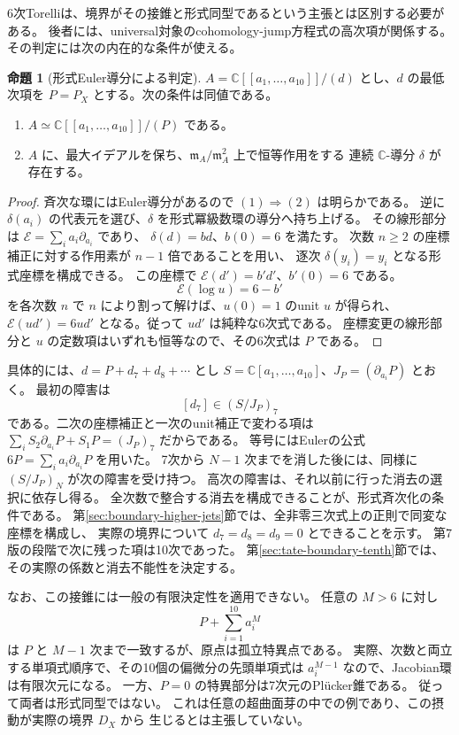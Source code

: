 \documentclass[a4paper,11pt]{ltjsarticle}
\theoremstyle{definition}
\newtheorem{theorem}{命題}[section]
\newcommand{\CC}{\mathbb C}
\begin{document}
6次Torelliは、境界がその接錐と形式同型であるという主張とは区別する必要がある。
後者には、universal対象のcohomology-jump方程式の高次項が関係する。
その判定には次の内在的な条件が使える。

\begin{theorem}[形式Euler導分による判定]\label{prop:boundary-euler}
$A=\CC[[a_1,\ldots,a_{10}]]/(d)$ とし、$d$ の最低次項を
$P=P_X$ とする。次の条件は同値である。
\begin{enumerate}
\item $A\simeq\CC[[a_1,\ldots,a_{10}]]/(P)$ である。
\item $A$ に、最大イデアルを保ち、$\mathfrak m_A/\mathfrak m_A^2$ 上で恒等作用をする
連続 $\CC$-導分 $\delta$ が存在する。
\end{enumerate}
\end{theorem}

\begin{proof}
斉次な環にはEuler導分があるので $(1)\Rightarrow(2)$ は明らかである。
逆に $\delta(a_i)$ の代表元を選び、$\delta$ を形式冪級数環の導分へ持ち上げる。
その線形部分は $\mathcal E=\sum_i a_i\partial_{a_i}$ であり、
$\delta(d)=b d$、$b(0)=6$ を満たす。
次数 $n\ge2$ の座標補正に対する作用素が $n-1$ 倍であることを用い、
逐次 $\delta(y_i)=y_i$ となる形式座標を構成できる。
この座標で $\mathcal E(d')=b'd'$、$b'(0)=6$ である。
\[
                      \mathcal E(\log u)=6-b'
\]
を各次数 $n$ で $n$ により割って解けば、$u(0)=1$ のunit $u$ が得られ、
$\mathcal E(ud')=6ud'$ となる。従って $ud'$ は純粋な6次式である。
座標変更の線形部分と $u$ の定数項はいずれも恒等なので、その6次式は $P$ である。
\end{proof}

具体的には、$d=P+d_7+d_8+\cdots$ とし
$S=\CC[a_1,\ldots,a_{10}]$、$J_P=(\partial_{a_i}P)$ とおく。
最初の障害は
\[
                             [d_7]\in(S/J_P)_7
\]
である。二次の座標補正と一次のunit補正で変わる項は
$\sum_iS_2\partial_{a_i}P+S_1P=(J_P)_7$ だからである。
等号にはEulerの公式 $6P=\sum_i a_i\partial_{a_i}P$ を用いた。
7次から $N-1$ 次までを消した後には、同様に $(S/J_P)_N$ が次の障害を受け持つ。
高次の障害は、それ以前に行った消去の選択に依存し得る。
全次数で整合する消去を構成できることが、形式斉次化の条件である。
第\ref{sec:boundary-higher-jets}節では、全非零三次式上の正則で同変な座標を構成し、
実際の境界について $d_7=d_8=d_9=0$ とできることを示す。
第7版の段階で次に残った項は10次であった。
第\ref{sec:tate-boundary-tenth}節では、その実際の係数と消去不能性を決定する。

なお、この接錐には一般の有限決定性を適用できない。
任意の $M>6$ に対し
\[
                         P+\sum_{i=1}^{10}a_i^M
\]
は $P$ と $M-1$ 次まで一致するが、原点は孤立特異点である。
実際、次数と両立する単項式順序で、その10個の偏微分の先頭単項式は
$a_i^{M-1}$ なので、Jacobian環は有限次元になる。
一方、$P=0$ の特異部分は7次元のPl\"ucker錐である。
従って両者は形式同型ではない。
これは任意の超曲面芽の中での例であり、この摂動が実際の境界 $D_X$ から
生じるとは主張していない。
\end{document}
